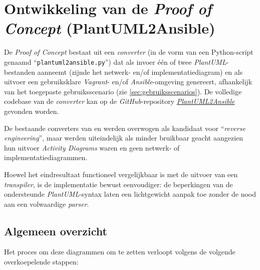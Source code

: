 
\chapter{Ontwikkeling van de \emph{Proof of Concept} (PlantUML2Ansible)}%
\label{ch:poc}

De \emph{Proof of Concept} bestaat uit een \emph{converter} (in de vorm van een Python-script genaamd ``\texttt{plantuml2ansible.py}'') dat als invoer één of twee \emph{PlantUML}-bestanden aanneemt (zijnde het netwerk- en/of implementatiediagram) en als uitvoer een gebruiksklare \emph{Vagrant}- en/of \emph{Ansible}-omgeving genereert, afhankelijk van het toegepaste gebruiksscenario (zie \autoref{sec:gebruiksscenarios}). De volledige codebase van de \emph{converter} kan op de \emph{GitHub}-repository \href{https://github.com/lucasluduenasegre/plantuml2ansible}{\emph{PlantUML2Ansible}} gevonden worden.

De bestaande converters van \textcite{teramako2023} en \textcite{rwxd2025} werden overwogen als kandidaat voor ``\emph{reverse engineering}'', maar werden uiteindelijk als minder bruikbaar geacht aangezien hun uitvoer \emph{Activity Diagrams} waren en geen netwerk- of implementatiediagrammen.

Hoewel het eindresultaat functioneel vergelijkbaar is met de uitvoer van een \emph{transpiler}, is de implementatie bewust eenvoudiger: de beperkingen van de ondersteunde \emph{PlantUML}-syntax laten een lichtgewicht aanpak toe zonder de nood aan een volwaardige \emph{parser}.

\section{Algemeen overzicht}%
\label{sec:alg_overzicht}

Het proces om deze diagrammen om te zetten verloopt volgens de volgende overkoepelende stappen:

